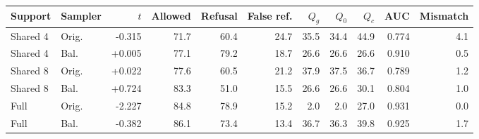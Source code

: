 \begin{tabular}{llrrrrrrrrr}
\toprule
Support & Sampler & $t$ & Allowed & Refusal & False ref. & $Q_g$ & $Q_0$ & $Q_c$ & AUC & Mismatch \\
\midrule
Shared 4 & Orig. & -0.315 & 71.7 & 60.4 & 24.7 & 35.5 & 34.4 & 44.9 & 0.774 & 4.1 \\
Shared 4 & Bal. & +0.005 & 77.1 & 79.2 & 18.7 & 26.6 & 26.6 & 26.6 & 0.910 & 0.5 \\
Shared 8 & Orig. & +0.022 & 77.6 & 60.5 & 21.2 & 37.9 & 37.5 & 36.7 & 0.789 & 1.2 \\
Shared 8 & Bal. & +0.724 & 83.3 & 51.0 & 15.5 & 26.6 & 26.6 & 30.1 & 0.804 & 1.0 \\
Full & Orig. & -2.227 & 84.8 & 78.9 & 15.2 & 2.0 & 2.0 & 27.0 & 0.931 & 0.0 \\
Full & Bal. & -0.382 & 86.1 & 73.4 & 13.4 & 36.7 & 36.3 & 39.8 & 0.925 & 1.7 \\
\bottomrule
\end{tabular}
